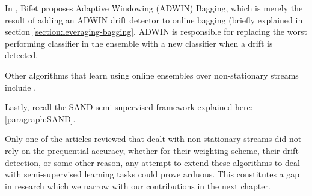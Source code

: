 In \cite{bifet2009new}, Bifet proposes Adaptive Windowing (ADWIN) Bagging, which is merely the result of adding an ADWIN drift detector to online bagging (briefly explained in section \ref{section:leveraging-bagging}. ADWIN is responsible for replacing the worst performing classifier in the ensemble with a new classifier when a drift is detected.

Other algorithms that learn using online ensembles over non-stationary streams include \cite{BRZEZINSKI201450, Kolter:2005:UAE:1102351.1102408, Kolter20072755, kuncheva2004classifier, minku2012ddd, stanley2003learning, yoshida2011adaptive}.

Lastly, recall the SAND semi-supervised framework explained here: \ref{paragraph:SAND}.

Only one of the articles reviewed that dealt with non-stationary streams did not rely on the prequential accuracy, whether for their weighting scheme, their drift detection, or some other reason, any attempt to extend these algorithms to deal with semi-supervised learning tasks could prove arduous. This constitutes a gap in research which we narrow with our contributions in the next chapter.